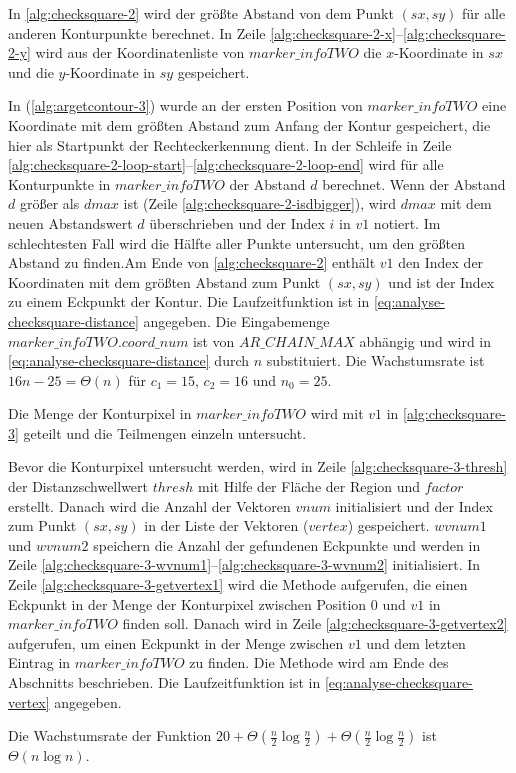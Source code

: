 In \autoref{alg:checksquare-2} wird der größte Abstand von dem Punkt $(\mathit{sx},\mathit{sy})$ für alle anderen
 Konturpunkte berechnet. In Zeile \ref{alg:checksquare-2-x}--\ref{alg:checksquare-2-y} wird aus der Koordinatenliste
 von $\mathit{marker\_infoTWO}$ die $x$-Koordinate in $\mathit{sx}$ und die $y$-Koordinate in $\mathit{sy}$
 gespeichert.

In  (\autoref{alg:argetcontour-3}) wurde an der ersten Position von $\mathit{marker\_infoTWO}$
 eine Koordinate mit dem größten Abstand zum Anfang der Kontur gespeichert, die hier als Startpunkt der
 Rechteckerkennung dient. In der Schleife in Zeile \ref{alg:checksquare-2-loop-start}--\ref{alg:checksquare-2-loop-end}
 wird für alle Konturpunkte in $\mathit{marker\_infoTWO}$ der Abstand $d$ berechnet. Wenn der Abstand $d$ größer als
 $\mathit{dmax}$ ist (Zeile \ref{alg:checksquare-2-isdbigger}), wird $\mathit{dmax}$ mit dem neuen Abstandswert $d$
 überschrieben und der Index $i$ in $\mathit{v1}$ notiert. Im schlechtesten Fall wird die Hälfte aller Punkte
 untersucht, um den größten Abstand zu finden.Am Ende von \autoref{alg:checksquare-2} enthält
 $\mathit{v1}$ den Index der Koordinaten mit dem größten Abstand zum Punkt $(\mathit{sx},\mathit{sy})$ und ist der
 Index zu einem Eckpunkt der Kontur. Die Laufzeitfunktion ist in \autoref{eq:analyse-checksquare-distance} angegeben.
 Die Eingabemenge $\mathit{marker\_infoTWO.coord\_num}$ ist von $\mathit{AR\_CHAIN\_MAX}$ abhängig und wird in
 \autoref{eq:analyse-checksquare-distance} durch $n$ substituiert. Die Wachstumsrate ist $16n - 25 = \Theta(n)$ für
 $c_{1} = 15$, $c_{2} = 16$ und $n_{0} = 25$.


Die Menge der Konturpixel in $\mathit{marker\_infoTWO}$ wird mit $\mathit{v1}$ in \autoref{alg:checksquare-3} geteilt
 und die Teilmengen einzeln untersucht.

Bevor die Konturpixel untersucht werden, wird in Zeile \ref{alg:checksquare-3-thresh} der Distanzschwellwert
 $\mathit{thresh}$ mit Hilfe der Fläche der Region und $\mathit{factor}$ erstellt. Danach wird die Anzahl der Vektoren
 $\mathit{vnum}$ initialisiert und der Index zum Punkt $(\mathit{sx}, \mathit{sy})$ in der Liste der Vektoren
 ($\mathit{vertex}$) gespeichert. $wvnum1$ und $wvnum2$ speichern die Anzahl der gefundenen Eckpunkte und werden in
 Zeile \ref{alg:checksquare-3-wvnum1}--\ref{alg:checksquare-3-wvnum2} initialisiert. In Zeile
 \ref{alg:checksquare-3-getvertex1} wird die Methode  aufgerufen, die einen Eckpunkt in der Menge
 der Konturpixel zwischen Position $0$ und $\mathit{v1}$ in $\mathit{marker\_infoTWO}$ finden soll. Danach wird
  in Zeile \ref{alg:checksquare-3-getvertex2} aufgerufen, um einen Eckpunkt in der Menge zwischen
 $\mathit{v1}$ und dem letzten Eintrag in $\mathit{marker\_infoTWO}$ zu finden. Die Methode  wird
 am Ende des Abschnitts beschrieben. Die Laufzeitfunktion ist in \autoref{eq:analyse-checksquare-vertex} angegeben.

Die Wachstumsrate der Funktion $20 + \Theta(\frac{n}{2} \log \frac{n}{2}) + \Theta(\frac{n}{2} \log \frac{n}{2})$ ist
 $\Theta(n \log n)$.

